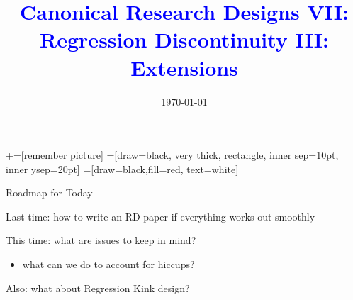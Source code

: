 \documentclass[notes,11pt, aspectratio=169]{beamer}
\title[]{\textcolor{blue}{Canonical Research Designs VII:\\ Regression
    Discontinuity III:\\ Extensions}} \author[PGP]{}
\institute[FRBNY]{\small{\begin{tabular}{c}
                           Paul Goldsmith-Pinkham  \\
\end{tabular}}}
\date{\today}
\newenvironment{wideitemize}{\itemize\addtolength{\itemsep}{10pt}}{\enditemize}
\begin{document}
\newcommand\marktopleft[1]{%
    \tikz[overlay,remember picture] 
        \node (marker-#1-a) at (-.3em,.3em) {};%
}
\newcommand\markbottomright[2]{%
    \tikz[overlay,remember picture] 
        \node (marker-#1-b) at (0em,0em) {};%
}
+=[remember picture] 
 =[draw=black, very thick, rectangle, inner sep=10pt, inner ysep=20pt]
 =[draw=black,fill=red, text=white]

\begin{frame}
\maketitle
\end{frame}

\begin{frame}{Roadmap for Today}
  \begin{wideitemize}
  \item Last time: how to write an RD paper if everything works out smoothly
  \item This time: what are issues to keep in mind?
    \begin{itemize}
    \item     what can we do to account for hiccups?
    \end{itemize}
  \item Also: what about Regression Kink design?
  \end{wideitemize}
\end{frame}
\end{document}
